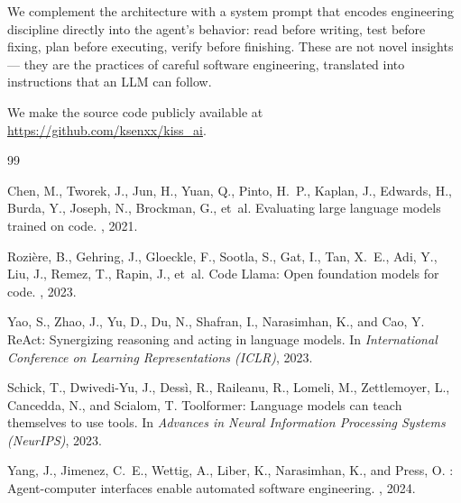 \documentclass{article}
\begin{document}
We complement the architecture with a system prompt that encodes
engineering discipline directly into the agent's behavior: read before
writing, test before fixing, plan before executing, verify before
finishing.  These are not novel insights --- they are the practices of
careful software engineering, translated into instructions that an LLM
can follow.

We make the source code publicly available at
\url{https://github.com/ksenxx/kiss_ai}.


{
\small



\begin{thebibliography}{99}

Chen, M., Tworek, J., Jun, H., Yuan, Q., Pinto, H.~P., Kaplan, J.,
Edwards, H., Burda, Y., Joseph, N., Brockman, G., et~al.
\newblock Evaluating large language models trained on code.
, 2021.

Rozi\`{e}re, B., Gehring, J., Gloeckle, F., Sootla, S., Gat, I.,
Tan, X.~E., Adi, Y., Liu, J., Remez, T., Rapin, J., et~al.
\newblock Code Llama: Open foundation models for code.
, 2023.

Yao, S., Zhao, J., Yu, D., Du, N., Shafran, I., Narasimhan, K., and
Cao, Y.
\newblock ReAct: Synergizing reasoning and acting in language models.
\newblock In {\em International Conference on Learning
  Representations (ICLR)}, 2023.

Schick, T., Dwivedi-Yu, J., Dess\`{i}, R., Raileanu, R., Lomeli, M.,
Zettlemoyer, L., Cancedda, N., and Scialom, T.
\newblock Toolformer: Language models can teach themselves to use
  tools.
\newblock In {\em Advances in Neural Information Processing Systems
  (NeurIPS)}, 2023.

Yang, J., Jimenez, C.~E., Wettig, A., Liber, K., Narasimhan, K., and
Press, O.
: Agent-computer interfaces enable automated
  software engineering.
, 2024.


\end{thebibliography}}
\end{document}
